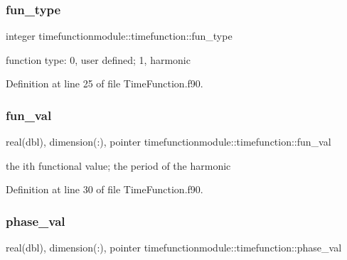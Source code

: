 \subsubsection{\texorpdfstring{fun\+\_\+type}{fun\_type}}
{\footnotesize\ttfamily integer timefunctionmodule\+::timefunction\+::fun\+\_\+type\hspace{0.3cm}{\ttfamily [private]}}



function type\+: 0, user defined; 1, harmonic 



Definition at line 25 of file Time\+Function.\+f90.

\mbox{\label{structtimefunctionmodule_1_1timefunction_a7d1b3a0f76df56f38891ba45d161ca9d}} 
\subsubsection{\texorpdfstring{fun\+\_\+val}{fun\_val}}
{\footnotesize\ttfamily real(dbl), dimension(\+:), pointer timefunctionmodule\+::timefunction\+::fun\+\_\+val\hspace{0.3cm}{\ttfamily [private]}}



the ith functional value; the period of the harmonic 



Definition at line 30 of file Time\+Function.\+f90.

\mbox{\label{structtimefunctionmodule_1_1timefunction_a0f4fd140ac6990ddc82b4129b23cfa08}} 
\subsubsection{\texorpdfstring{phase\+\_\+val}{phase\_val}}
{\footnotesize\ttfamily real(dbl), dimension(\+:), pointer timefunctionmodule\+::timefunction\+::phase\+\_\+val\hspace{0.3cm}{\ttfamily [private]}}



